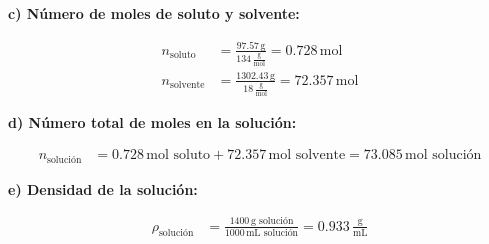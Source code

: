 \documentclass{article}
\begin{document}
\textbf{c) Número de moles de soluto y solvente:}

\begin{align*}
    n_{\text{soluto}} &= \frac{97.57 \, \text{g}}{134 \, \frac{\text{g}}{\text{mol}}} = 0.728 \, \text{mol} \\[10pt]
    n_{\text{solvente}} &= \frac{1302.43 \, \text{g}}{18 \, \frac{\text{g}}{\text{mol}}} = 72.357 \, \text{mol}
\end{align*}

\textbf{d) Número total de moles en la solución:}

\begin{align*}
    n_{\text{solución}} &= 0.728 \, \text{mol soluto} + 72.357 \, \text{mol solvente} = 73.085 \, \text{mol solución}
\end{align*}

\textbf{e) Densidad de la solución:}

\begin{align*}
    \rho_{\text{solución}} &= \frac{1400 \, \text{g solución}}{1000 \, \text{mL solución}} = 0.933 \, \frac{\text{g}}{\text{mL}}
\end{align*}

\end{document}
